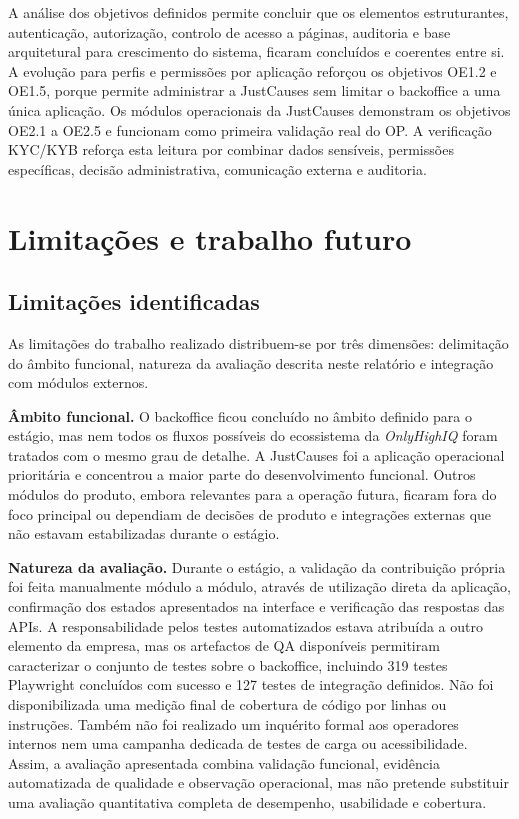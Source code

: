 A análise dos objetivos definidos permite concluir que os elementos estruturantes, autenticação, autorização, controlo de acesso a páginas, auditoria e base arquitetural para crescimento do sistema, ficaram concluídos e coerentes entre si. A evolução para perfis e permissões por aplicação reforçou os objetivos OE1.2 e OE1.5, porque permite administrar a JustCauses sem limitar o backoffice a uma única aplicação. Os módulos operacionais da JustCauses demonstram os objetivos OE2.1 a OE2.5 e funcionam como primeira validação real do OP. A verificação \gls{KYC}/\gls{KYB} reforça esta leitura por combinar dados sensíveis, permissões específicas, decisão administrativa, comunicação externa e auditoria.


\section{Limitações e trabalho futuro}
\label{sec:limitacoes_trabalho_futuro}

\subsection{Limitações identificadas}
\label{subsec:limitacoes}

As limitações do trabalho realizado distribuem-se por três dimensões: delimitação do âmbito funcional, natureza da avaliação descrita neste relatório e integração com módulos externos.

\textbf{Âmbito funcional.} O backoffice ficou concluído no âmbito definido para o estágio, mas nem todos os fluxos possíveis do ecossistema da \textit{OnlyHighIQ} foram tratados com o mesmo grau de detalhe. A JustCauses foi a aplicação operacional prioritária e concentrou a maior parte do desenvolvimento funcional. Outros módulos do produto, embora relevantes para a operação futura, ficaram fora do foco principal ou dependiam de decisões de produto e integrações externas que não estavam estabilizadas durante o estágio.

\textbf{Natureza da avaliação.} Durante o estágio, a validação da contribuição própria foi feita manualmente módulo a módulo, através de utilização direta da aplicação, confirmação dos estados apresentados na interface e verificação das respostas das \glspl{API}. A responsabilidade pelos testes automatizados estava atribuída a outro elemento da empresa, mas os artefactos de \gls{QA} disponíveis permitiram caracterizar o conjunto de testes sobre o backoffice, incluindo 319 testes Playwright concluídos com sucesso e 127 testes de integração definidos. Não foi disponibilizada uma medição final de cobertura de código por linhas ou instruções. Também não foi realizado um inquérito formal aos operadores internos nem uma campanha dedicada de testes de carga ou acessibilidade. Assim, a avaliação apresentada combina validação funcional, evidência automatizada de qualidade e observação operacional, mas não pretende substituir uma avaliação quantitativa completa de desempenho, usabilidade e cobertura.

